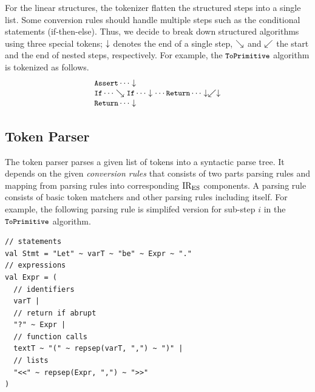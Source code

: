 For the linear structures, the tokenizer flatten the structured steps into
a single list. Some conversion rules should handle multiple steps such as
the conditional statements (if-then-else). Thus, we decide to break down
structured algorithms using three special tokens;
\( \downarrow \) denotes the end of a single step,
\( \searrow \) and \( \swarrow \) the start and the end of nested steps, respectively.
For example, the \( \texttt{\small ToPrimitive} \) algorithm is tokenized as follows.
\[
  \begin{array}{l}
    \texttt{\small Assert} \cdots \downarrow\\
    \texttt{\small If} \cdots \searrow \texttt{\small If} \cdots \downarrow
    \cdots \texttt{\small Return} \cdots \downarrow \swarrow \downarrow\\
    \texttt{\small Return} \cdots \downarrow\\
  \end{array}
\]

\subsection{Token Parser}

The token parser parses a given list of tokens into a syntactic parse tree.
It depends on the given \textit{conversion rules} that consists of
two parts parsing rules and mapping from parsing rules into corresponding
\( \text{IR}_\text{ES} \) components.
A parsing rule consists of basic token matchers and other parsing rules
including itself. For example, the following parsing rule is simplifed version for
sub-step \( i \) in the \( \texttt{\small ToPrimitive} \) algorithm.
\begin{lstlisting}[style=myScalastyle]
// statements
val Stmt = "Let" ~ varT ~ "be" ~ Expr ~ "."
// expressions
val Expr = (
  // identifiers
  varT |
  // return if abrupt
  "?" ~ Expr |
  // function calls
  textT ~ "(" ~ repsep(varT, ",") ~ ")" |
  // lists
  "<<" ~ repsep(Expr, ",") ~ ">>"
)
\end{lstlisting}

